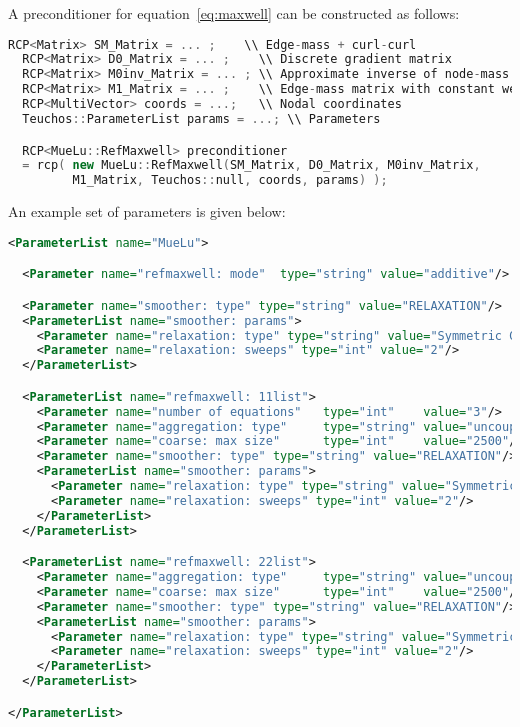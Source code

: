 A preconditioner for equation~\ref{eq:maxwell} can be constructed as follows:
\begin{lstlisting}[language=C++]
  RCP<Matrix> SM_Matrix = ... ;    \\ Edge-mass + curl-curl
  RCP<Matrix> D0_Matrix = ... ;    \\ Discrete gradient matrix
  RCP<Matrix> M0inv_Matrix = ... ; \\ Approximate inverse of node-mass matrix with weight 1/alpha
  RCP<Matrix> M1_Matrix = ... ;    \\ Edge-mass matrix with constant weight 1
  RCP<MultiVector> coords = ...;   \\ Nodal coordinates
  Teuchos::ParameterList params = ...; \\ Parameters

  RCP<MueLu::RefMaxwell> preconditioner
  = rcp( new MueLu::RefMaxwell(SM_Matrix, D0_Matrix, M0inv_Matrix,
         M1_Matrix, Teuchos::null, coords, params) );
\end{lstlisting}
An example set of parameters is given below:
\begin{lstlisting}[language=XML]
  <ParameterList name="MueLu">

  <Parameter name="refmaxwell: mode"  type="string" value="additive"/>

  <Parameter name="smoother: type" type="string" value="RELAXATION"/>
  <ParameterList name="smoother: params">
    <Parameter name="relaxation: type" type="string" value="Symmetric Gauss-Seidel"/>
    <Parameter name="relaxation: sweeps" type="int" value="2"/>
  </ParameterList>

  <ParameterList name="refmaxwell: 11list">
    <Parameter name="number of equations"   type="int"    value="3"/>
    <Parameter name="aggregation: type"     type="string" value="uncoupled"/>
    <Parameter name="coarse: max size"      type="int"    value="2500"/>
    <Parameter name="smoother: type" type="string" value="RELAXATION"/>
    <ParameterList name="smoother: params">
      <Parameter name="relaxation: type" type="string" value="Symmetric Gauss-Seidel"/>
      <Parameter name="relaxation: sweeps" type="int" value="2"/>
    </ParameterList>
  </ParameterList>

  <ParameterList name="refmaxwell: 22list">
    <Parameter name="aggregation: type"     type="string" value="uncoupled"/>
    <Parameter name="coarse: max size"      type="int"    value="2500"/>
    <Parameter name="smoother: type" type="string" value="RELAXATION"/>
    <ParameterList name="smoother: params">
      <Parameter name="relaxation: type" type="string" value="Symmetric Gauss-Seidel"/>
      <Parameter name="relaxation: sweeps" type="int" value="2"/>
    </ParameterList>
  </ParameterList>

</ParameterList>
\end{lstlisting}
